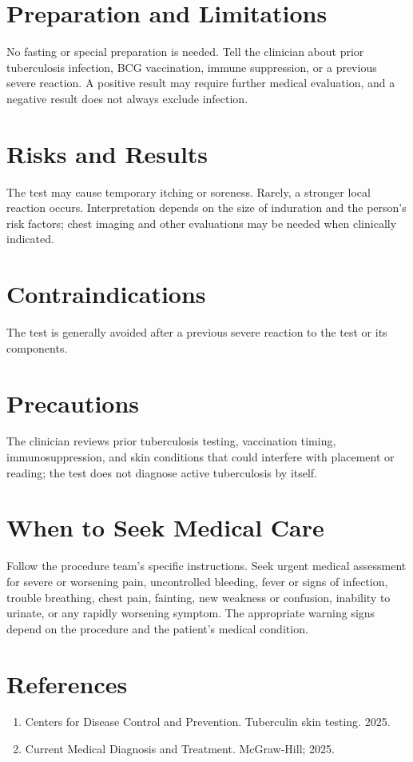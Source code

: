 \section*{Preparation and Limitations}
No fasting or special preparation is needed. Tell the clinician about prior tuberculosis infection, BCG vaccination, immune suppression, or a previous severe reaction. A positive result may require further medical evaluation, and a negative result does not always exclude infection.

\section*{Risks and Results}
The test may cause temporary itching or soreness. Rarely, a stronger local reaction occurs. Interpretation depends on the size of induration and the person's risk factors; chest imaging and other evaluations may be needed when clinically indicated.

\section*{Contraindications}
The test is generally avoided after a previous severe reaction to the test or its components.

\section*{Precautions}
The clinician reviews prior tuberculosis testing, vaccination timing, immunosuppression, and skin conditions that could interfere with placement or reading; the test does not diagnose active tuberculosis by itself.

\section*{When to Seek Medical Care}
Follow the procedure team's specific instructions. Seek urgent medical assessment for severe or worsening pain, uncontrolled bleeding, fever or signs of infection, trouble breathing, chest pain, fainting, new weakness or confusion, inability to urinate, or any rapidly worsening symptom. The appropriate warning signs depend on the procedure and the patient's medical condition.

\section*{References}
\begin{enumerate}
  \item Centers for Disease Control and Prevention. Tuberculin skin testing. 2025.
  \item Current Medical Diagnosis and Treatment. McGraw-Hill; 2025.
\end{enumerate}
\clearpage
